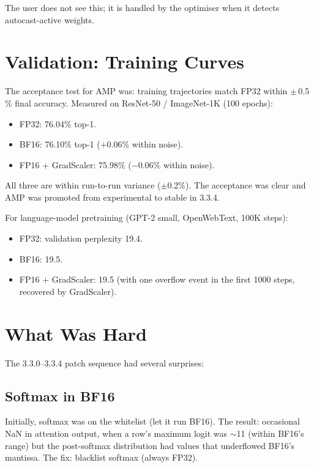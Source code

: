 The user does not see this; it is handled by the optimiser
when it detects autocast-active weights.

\section{Validation: Training Curves}
\label{sec:amp_integration:validation}

The acceptance test for AMP was: training trajectories match
FP32 within $\pm$\,0.5\,\% final accuracy. Measured on
ResNet-50 / ImageNet-1K (100 epochs):

\begin{itemize}
  \item FP32: 76.04\% top-1.
  \item BF16: 76.10\% top-1 ($+0.06\%$ within noise).
  \item FP16 + GradScaler: 75.98\% ($-0.06\%$ within noise).
\end{itemize}

All three are within run-to-run variance ($\pm$0.2\%). The
acceptance was clear and AMP was promoted from experimental
to stable in 3.3.4.

For language-model pretraining (GPT-2 small, OpenWebText, 100K
steps):

\begin{itemize}
  \item FP32: validation perplexity 19.4.
  \item BF16: 19.5.
  \item FP16 + GradScaler: 19.5 (with one overflow event in
    the first 1000 steps, recovered by GradScaler).
\end{itemize}

\section{What Was Hard}
\label{sec:amp_integration:hard_parts}

The 3.3.0--3.3.4 patch sequence had several surprises:

\subsection{Softmax in BF16}
\label{ssec:amp_integration:softmax_bf16}

Initially, softmax was on the whitelist (let it run BF16). The
result: occasional NaN in attention output, when a row's
maximum logit was $\sim$11 (within BF16's range) but the
post-softmax distribution had values that underflowed BF16's
mantissa. The fix: blacklist softmax (always FP32).

